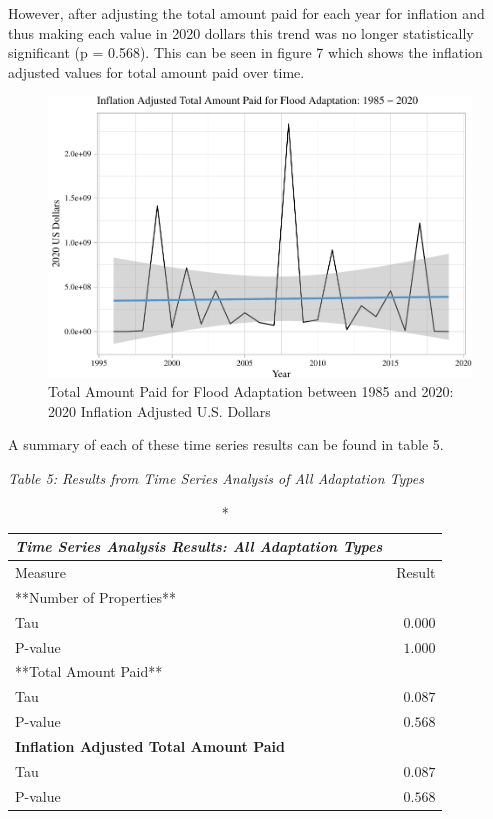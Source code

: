 \documentclass[
  12pt,
]{article}
\begin{document}
However, after adjusting the total amount paid for each year for
inflation and thus making each value in 2020 dollars this trend was no
longer statistically significant (p = 0.568). This can be seen in figure
7 which shows the inflation adjusted values for total amount paid over
time.

\begin{figure}
\centering
\includegraphics{finalreport_files/figure-latex/unnamed-chunk-14-1.pdf}
\caption{Total Amount Paid for Flood Adaptation between 1985 and 2020:
2020 Inflation Adjusted U.S. Dollars}
\end{figure}

\newpage

A summary of each of these time series results can be found in table 5.

\emph{Table 5: Results from Time Series Analysis of All Adaptation
Types}\\
\captionsetup[table]{labelformat=empty,skip=1pt}

\begin{longtable}{lr}
\caption*{
{\large \emph{\textbf{Time Series Analysis Results: All Adaptation Types}}}
} \\ 
\toprule
Measure & Result \\ 
\midrule
\multicolumn{1}{l}{**Number of Properties**} \\ 
\midrule
Tau & $0.000$ \\ 
P-value & $1.000$ \\ 
\midrule
\multicolumn{1}{l}{**Total Amount Paid**} \\ 
\midrule
Tau & $0.087$ \\ 
P-value & $0.568$ \\ 
\midrule
\multicolumn{1}{l}{\textbf{Inflation Adjusted Total Amount Paid}} \\ 
\midrule
Tau & $0.087$ \\ 
P-value & $0.568$ \\ 
\bottomrule
\end{longtable}
\end{document}
